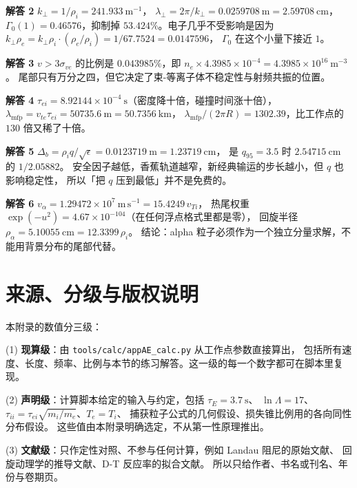 \textbf{解答 2} $k_\perp=1/\rho_i=241.933\ \mathrm{m^{-1}}$，
$\lambda_\perp=2\pi/k_\perp=0.0259708\ \mathrm{m}=2.59708\ \mathrm{cm}$，
$\Gamma_0(1)=0.46576$，抑制掉 $53.424\%$。电子几乎不受影响是因为
$k_\perp\rho_e=k_\perp\rho_i\cdot(\rho_e/\rho_i)=1/67.7524=0.0147596$，
$\Gamma_0$ 在这个小量下接近 $1$。

\textbf{解答 3} $v>3\sigma_{ve}$ 的比例是 $0.043985\%$，即
$n_e\times4.3985\times10^{-4}=4.3985\times10^{16}\ \mathrm{m^{-3}}$。
尾部只有万分之四，但它决定了束-等离子体不稳定性与射频共振的位置。

\textbf{解答 4} $\tau_{ei}=8.92144\times10^{-4}\ \mathrm{s}$（密度降十倍，碰撞时间涨十倍），
$\lambda_{\mathrm{mfp}}=v_{te}\tau_{ei}=50735.6\ \mathrm{m}=50.7356\ \mathrm{km}$，
$\lambda_{\mathrm{mfp}}/(2\pi R)=1302.39$，比工作点的 $130$ 倍又稀了十倍。

\textbf{解答 5} $\Delta_b=\rho_iq/\sqrt{\epsilon}=0.0123719\ \mathrm{m}=1.23719\ \mathrm{cm}$，
是 $q_{95}=3.5$ 时 $2.54715\ \mathrm{cm}$ 的 $1/2.05882$。
安全因子越低，香蕉轨道越窄，新经典输运的步长越小，但 $q$ 也影响稳定性，
所以「把 $q$ 压到最低」并不是免费的。

\textbf{解答 6} $v_\alpha=1.29472\times10^{7}\ \mathrm{m\,s^{-1}}=15.4249\,v_{Ti}$，
热尾权重 $\exp(-u^2)=4.67\times10^{-104}$（在任何浮点格式里都是零），
回旋半径 $\rho_\alpha=5.10055\ \mathrm{cm}=12.3399\,\rho_i$。
结论：alpha 粒子必须作为一个独立分量求解，不能用背景分布的尾部代替。

\section{来源、分级与版权说明}
\label{sec:app-ae-source}

\begingroup\small
本附录的数值分三级：

(1) \textbf{现算级}：由 \texttt{tools/\allowbreak{}calc/\allowbreak{}appAE\_calc.py} 从工作点参数直接算出，
包括所有速度、长度、频率、比例与本节的练习解答。这一级的每一个数字都可在脚本里复现。

(2) \textbf{声明级}：计算脚本给定的输入与约定，包括 $\tau_E=3.7\ \mathrm{s}$、
$\ln\Lambda=17$、$\tau_{ii}=\tau_{ei}\sqrt{m_i/m_e}$、$T_e=T_i$、
捕获粒子公式的几何假设、损失锥比例用的各向同性分布假设。
这些值由本附录明确选定，不从第一性原理推出。

(3) \textbf{文献级}：只作定性对照、不参与任何计算，例如 Landau 阻尼的原始文献、
回旋动理学的推导文献、D-T 反应率的拟合文献。
所以只给作者、书名或刊名、年份与卷期页。

